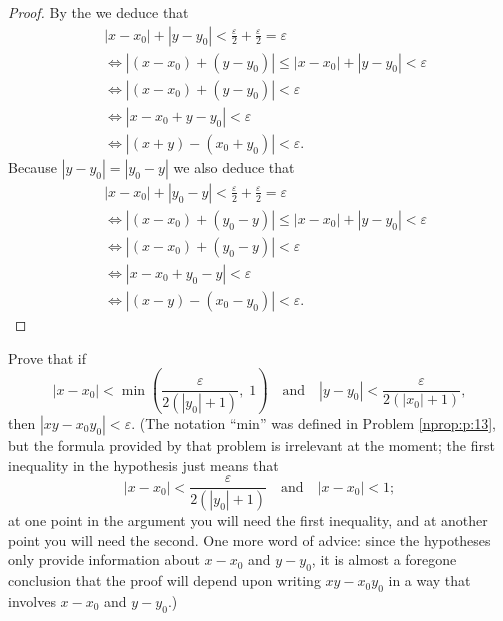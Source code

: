 \begin{proof}
	By the  we deduce that
	\begin{align*}
		 & |x - x_0| + |y - y_0| < \frac{\varepsilon}{2} + \frac{\varepsilon}{2} = \varepsilon \\
		 & \iff |(x - x_0) + (y - y_0)| \leq |x - x_0| + |y - y_0| < \varepsilon               \\
		 & \iff |(x - x_0) + (y - y_0)| < \varepsilon                                          \\
		 & \iff |x - x_0 + y - y_0| < \varepsilon                                              \\
		 & \iff |(x + y) - (x_0 + y_0)| < \varepsilon.
	\end{align*}
	Because $|y - y_0| = |y_0 - y|$ we also deduce that
	\begin{align*}
		 & |x - x_0| + |y_0 - y| < \frac{\varepsilon}{2} + \frac{\varepsilon}{2} = \varepsilon \\
		 & \iff |(x - x_0) + (y_0 - y)| \leq |x - x_0| + |y - y_0| < \varepsilon               \\
		 & \iff |(x - x_0) + (y_0 - y)| < \varepsilon                                          \\
		 & \iff |x - x_0 + y_0 - y| < \varepsilon                                              \\
		 & \iff |(x - y) - (x_0 - y_0)| < \varepsilon.
	\end{align*}
\end{proof}


\Newpage
\begin{problem} %
	\label{nprop:p:21}

	Prove that if
	$$
		|x - x_0| < \min \left( \frac{\varepsilon}{2(|y_0| + 1)}, \; 1 \right) \quad \text {and} \quad |y - y_0| < \frac{\varepsilon}{2(|x_0| + 1)},
	$$
	then $|x y - x_0 y_0| < \varepsilon$.
	(The notation ``min'' was defined in Problem \ref{nprop:p:13}, but the formula provided by that problem is irrelevant at the moment; the first inequality in the hypothesis just means that
	$$
		|x - x_0| < \frac{\varepsilon}{2(|y_0| + 1)} \quad \text {and} \quad |x - x_0| < 1;
	$$
	at one point in the argument you will need the first inequality, and at another point you will need the second. One more word of advice: since the hypotheses only provide information about $x - x_0$ and $y - y_0$, it is almost a foregone conclusion that the proof will depend upon writing $x y - x_0 y_0$ in a way that involves $x - x_0$ and $y - y_0$.)
\end{problem}


